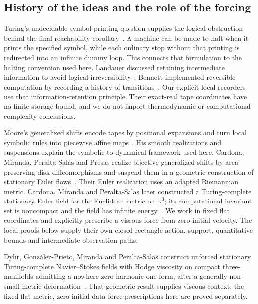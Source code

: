 \documentclass[11pt]{article}
\begin{document}
\subsection{History of the ideas and the role of the forcing}
Turing's undecidable symbol-printing question supplies the logical obstruction behind the final reachability corollary~\cite[Section~8]{Turing1936}. A machine can be made to halt when it prints the specified symbol, while each ordinary stop without that printing is redirected into an infinite dummy loop. This connects that formulation to the halting convention used here. Landauer discussed retaining intermediate information to avoid logical irreversibility~\cite[Section~3]{Landauer1961}; Bennett implemented reversible computation by recording a history of transitions~\cite{Bennett1973}. Our explicit local recorders use that information-retention principle. Their exact-real tape coordinates have no finite-storage bound, and we do not import thermodynamic or computational-complexity conclusions.

Moore's generalized shifts encode tapes by positional expansions and turn local symbolic rules into piecewise affine maps~\cite{Moore1990,Moore1991}. His smooth realizations and suspensions explain the symbolic-to-dynamical framework used here. Cardona, Miranda, Peralta-Salas and Presas realize bijective generalized shifts by area-preserving disk diffeomorphisms and suspend them in a geometric construction of stationary Euler flows~\cite[Proposition~5.1 and Theorem~3.1]{CardonaMirandaPeraltaSalasPresas2021}. Their Euler realization uses an adapted Riemannian metric. Cardona, Miranda and Peralta-Salas later constructed a Turing-complete stationary Euler field for the Euclidean metric on $\mathbb R^3$; its computational invariant set is noncompact and the field has infinite energy~\cite[arXiv v3, Theorem~1 and the following discussion]{CardonaMirandaPeraltaSalas2023}. We work in fixed flat coordinates and explicitly prescribe a viscous force from zero initial velocity. The local proofs below supply their own closed-rectangle action, support, quantitative bounds and intermediate observation paths.

Dyhr, Gonz\'alez-Prieto, Miranda and Peralta-Salas construct unforced stationary Turing-complete Navier--Stokes fields with Hodge viscosity on compact three-manifolds admitting a nowhere-zero harmonic one-form, after a generally non-small metric deformation~\cite[Theorem~A]{DyhrGonzalezPrietoMirandaPeraltaSalas2026}. That geometric result supplies viscous context; the fixed-flat-metric, zero-initial-data force prescriptions here are proved separately.
\end{document}
